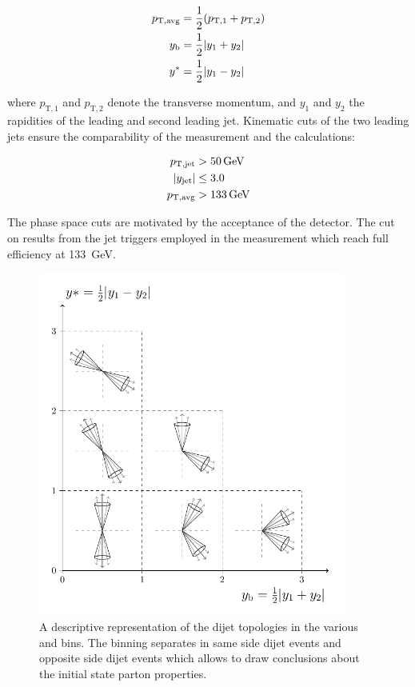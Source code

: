 \begin{align*}
p_{\mathrm{T,avg}} &=\frac{1}{2}(p_{\mathrm{T},1} + p_{\mathrm{T},2})\\
y_{\mathrm{b}}& =\frac{1}{2}|y_1 + y_2|\\
y^* &=\frac{1}{2}|y_1 - y_2|
\end{align*}

where $p_{\mathrm{T},1}$ and $p_{\mathrm{T},2}$ denote the transverse momentum,
and $y_1$ and $y_2$ the rapidities of the leading and second leading jet.
Kinematic cuts of the two leading jets ensure the comparability of the
measurement and the calculations:

\begin{align*}
    \ptjet &> \SI{50}{\GeV}\\
    |y_\mathrm{jet}| &\leq 3.0\\
    \ptavg &> \SI{133}{\GeV}
\end{align*}

The phase space cuts are motivated by the acceptance of the detector. The cut on
\ptavg results from the jet triggers employed in the measurement which reach
full efficiency at \SI{133}{\GeV}.

\begin{figure}[h!tbp]
    \centering
    \includegraphics[width=0.9\textwidth]{figures/measurement/ybys.pdf}
    \caption[Dijet topologies in \ystar and \yboost phasespace]
        {A descriptive representation of the dijet topologies in the various
    \ystar and \yboost bins. The binning separates in same side dijet
    events and opposite side dijet events which allows to draw conclusions about
    the initial state parton properties.}
    \label{fig:ysyb_schema}
\end{figure}

